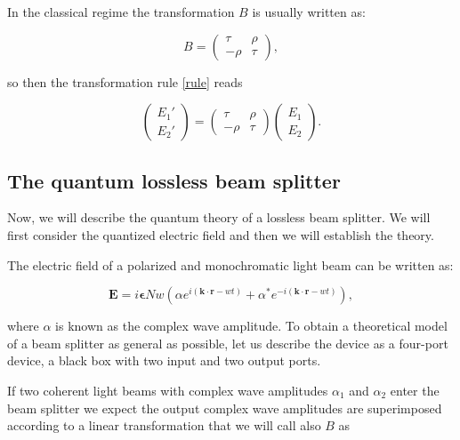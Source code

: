 \documentclass[12pt]{book}
\begin{document}
 In the classical regime the transformation $B$ is usually written as:
 
 \begin{equation}
 B=\begin{pmatrix} \tau & \rho \\ -\rho & \tau \end{pmatrix},
 \end{equation}


so then the transformation rule \ref{rule} reads

\begin{equation}
\begin{pmatrix} E_{1}' \\ E_{2}' \end{pmatrix}=\begin{pmatrix} \tau & \rho \\ -\rho & \tau \end{pmatrix} \begin{pmatrix} E_{1} \\ E_{2} \end{pmatrix}.
\end{equation}




\subsection{The quantum lossless beam splitter}

Now, we will describe the quantum theory of a lossless beam splitter. We will first consider the quantized electric field and then we will establish the theory. 


The electric field of a polarized and monochromatic light beam can be written as:

\begin{equation}
\mathbf{E}=i \mathbf{\epsilon}N w \left( \alpha e^{i (\mathbf{k \cdot r}-w t)}+\alpha^{*} e^{-i (\mathbf{k \cdot r}-w t)} \right),
\end{equation}

where $\alpha$ is known as the complex wave amplitude. To obtain a theoretical model of a beam splitter as general as possible, let us describe the device as a four-port device, a black box with two input and two output ports.

If two coherent light beams with complex wave amplitudes $\alpha_{1}$ and $\alpha_{2}$ enter the beam splitter we expect the output complex wave amplitudes  are superimposed according to a linear transformation that we will call also $B$ as
\end{document}
